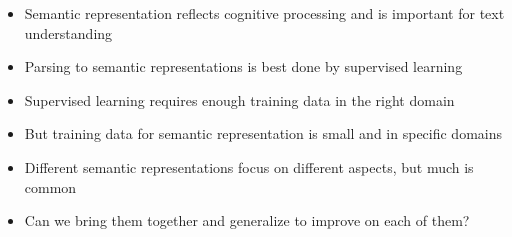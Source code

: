 \documentclass[t,xcolor={svgnames}]{beamer}
\begin{document}
\begin{frame}
\begin{flushright}
\end{flushright}
\end{frame}

\begin{frame}
\begin{itemize}
\item Semantic representation reflects cognitive processing and is important for text understanding
\item Parsing to semantic representations is best done by supervised learning
\item Supervised learning requires enough training data in the right domain
\item But training data for semantic representation is small and in specific domains
\item Different semantic representations focus on different aspects, but much is common
\item Can we bring them together and generalize to improve on each of them?
\end{itemize}
\end{frame}
\end{document}
